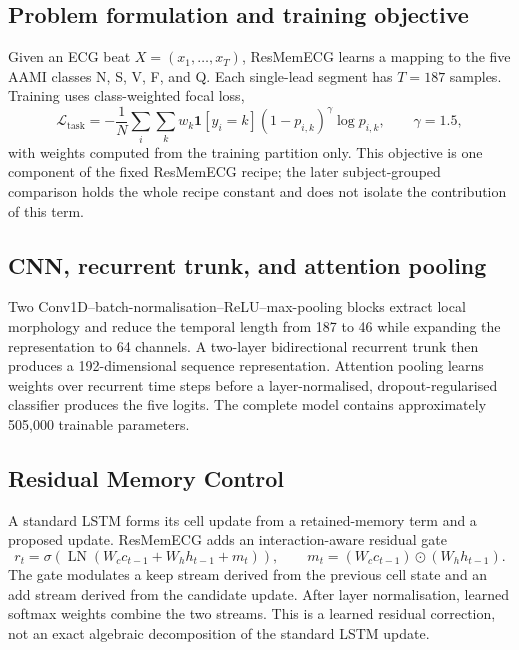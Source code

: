 \documentclass[pdflatex,sn-mathphys-num]{sn-jnl}
\begin{document}
\subsection{Problem formulation and training objective}
Given an ECG beat $X=(x_1,\ldots,x_T)$, ResMemECG learns a mapping to the five
AAMI classes N, S, V, F, and Q. Each single-lead segment has $T=187$ samples.
Training uses class-weighted focal loss,
\begin{equation}
\mathcal{L}_{\mathrm{task}}=-\frac{1}{N}\sum_i\sum_k w_k
\mathbf{1}[y_i=k](1-p_{i,k})^{\gamma}\log p_{i,k},\qquad \gamma=1.5,
\end{equation}
with weights computed from the training partition only. This objective is one
component of the fixed ResMemECG recipe; the later subject-grouped comparison
holds the whole recipe constant and does not isolate the contribution of this
term.

\subsection{CNN, recurrent trunk, and attention pooling}
Two Conv1D--batch-normalisation--ReLU--max-pooling blocks extract local
morphology and reduce the temporal length from 187 to 46 while expanding the
representation to 64 channels. A two-layer bidirectional recurrent trunk then
produces a 192-dimensional sequence representation. Attention pooling learns
weights over recurrent time steps before a layer-normalised, dropout-regularised
classifier produces the five logits. The complete model contains approximately
505,000 trainable parameters.

\subsection{Residual Memory Control}
A standard LSTM forms its cell update from a retained-memory term and a proposed
update. ResMemECG adds an interaction-aware residual gate
\begin{equation}
r_t=\sigma\!\left(\operatorname{LN}(W_c c_{t-1}+W_h h_{t-1}+m_t)\right),
\qquad m_t=(W_c c_{t-1})\odot(W_h h_{t-1}).
\end{equation}
The gate modulates a keep stream derived from the previous cell state and an add
stream derived from the candidate update. After layer normalisation, learned
softmax weights combine the two streams. This is a learned residual correction,
not an exact algebraic decomposition of the standard LSTM update.
\end{document}
